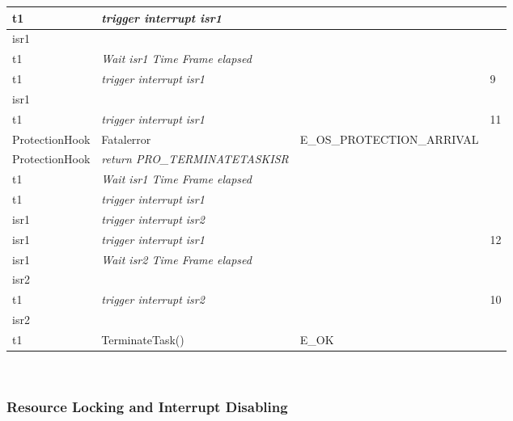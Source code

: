 \documentclass[10pt]{article}
\newlength{\Li}\settowidth{\Li}{Running}
\newlength{\Lii}\setlength{\Lii}{7cm}
\newlength{\Liiii}\setlength{\Liiii}{0.9cm}
\newlength{\Liii}\setlength{\Liii}{\textwidth} \addtolength{\Liii}{-\Li} \addtolength{\Liii}{-\Lii} \addtolength{\Liii}{-\Liiii}
\begin{document}
	\begin{supertabular}{|p{\Li}|p{\Lii}|p{\Liii}|p{\Liiii}|} \hline 
	t1	& \textit{trigger interrupt isr1}					& 												& \\ \hline
	isr1	& 										& 												& \\ \hline
	t1	& \textit{Wait isr1 Time Frame elapsed}			& 												& \\ \hline
	t1	& \textit{trigger interrupt isr1}					& 												& 9 \\ \hline
	isr1	& 										& 												& \\ \hline
	t1	& \textit{trigger interrupt isr1}					& 												& 11 \\ \hline
	ProtectionHook		& Fatalerror					& E\_OS\_PROTECTION\_ARRIVAL						& \\ \hline
	ProtectionHook		& \textit{return PRO\_TERMINATETASKISR}	&										& \\ \hline
	t1	& \textit{Wait isr1 Time Frame elapsed}			& 												& \\ \hline
	t1	& \textit{trigger interrupt isr1}					& 												& \\ \hline
	isr1	& \textit{trigger interrupt isr2}					& 												& \\ \hline
	isr1	& \textit{trigger interrupt isr1}					& 												& 12 \\ \hline
	isr1	& \textit{Wait isr2 Time Frame elapsed}			& 												& \\ \hline
	isr2	& 										& 												& \\ \hline
	t1	& \textit{trigger interrupt isr2}					& 												& 10 \\ \hline
	isr2	& 										& 												& \\ \hline
	t1	& TerminateTask()							& E\_OK											& \\ \hline
	\end{supertabular}\\	

\subsubsection{Resource Locking and Interrupt Disabling}
	

\end{document}
